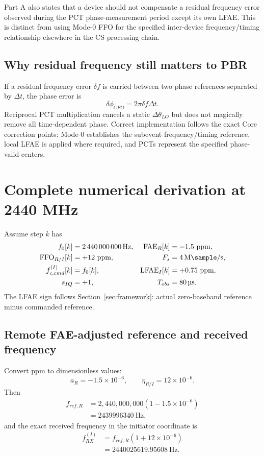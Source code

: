 \documentclass[10pt,a4paper]{article}
\newcommand{\FFO}{\mathrm{FFO}}
\newcommand{\FAE}{\mathrm{FAE}}
\newcommand{\LFAE}{\mathrm{LFAE}}
\begin{document}
Part A also states that a device should not compensate a residual frequency error observed during the PCT phase-measurement period except its own LFAE. This is distinct from using Mode-0 FFO for the specified inter-device frequency/timing relationship elsewhere in the CS processing chain.

\subsection{Why residual frequency still matters to PBR}
If a residual frequency error $\delta f$ is carried between two phase references separated by $\Delta t$, the phase error is
\begin{equation}
\delta\phi_{CFO}=2\pi\delta f\Delta t.
\end{equation}
Reciprocal PCT multiplication cancels a static $\Delta\theta_{LO}$ but does not magically remove all time-dependent phase. Correct implementation follows the exact Core correction points: Mode-0 establishes the subevent frequency/timing reference, local LFAE is applied where required, and PCTs represent the specified phase-valid centers.

\section{Complete numerical derivation at 2440 MHz}
\label{sec:example}
Assume step $k$ has
\begin{align*}
f_0[k]&=\SI{2440000000}{\hertz}, & \FAE_R[k]&=-1.5\ \text{ppm},\\
\FFO_{R/I}[k]&=+12\ \text{ppm}, & F_s&=\SI{4}{\mega\sample\per\second},\\
f_{c,cmd}^{(I)}[k]&=f_0[k], & \LFAE_I[k]&=+0.75\ \text{ppm},\\
s_{IQ}&=+1, & T_{obs}&=\SI{80}{\micro\second}.
\end{align*}
The LFAE sign follows Section~\ref{sec:framework}: actual zero-baseband reference minus commanded reference.

\subsection{Remote FAE-adjusted reference and received frequency}
Convert ppm to dimensionless values:
\begin{equation}
a_R=-1.5\times10^{-6},\qquad \eta_{R/I}=12\times10^{-6}.
\end{equation}
Then
\begin{align}
f_{ref,R}&=2,440,000,000(1-1.5\times10^{-6})\\
&=\SI{2439996340}{\hertz},
\end{align}
and the exact received frequency in the initiator coordinate is
\begin{align}
f_{RX}^{(I)}&=f_{ref,R}(1+12\times10^{-6})\\
&=\SI{2440025619.95608}{\hertz}.
\label{eq:examplefrx}
\end{align}
\end{document}
